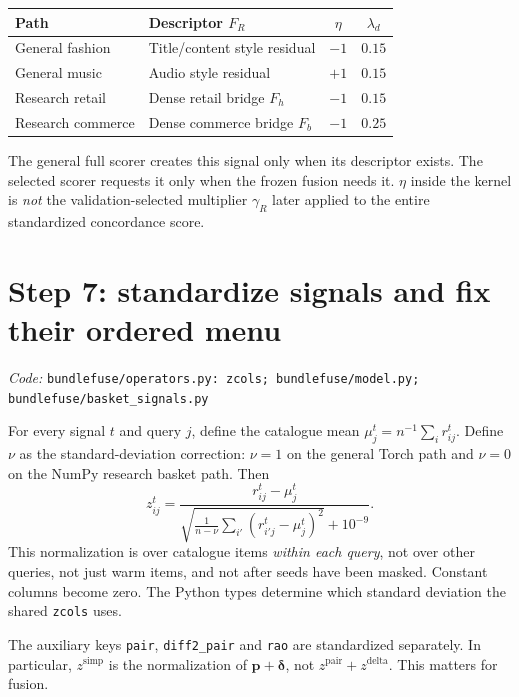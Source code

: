 \documentclass[11pt,a4paper]{article}
\newcommand{\code}[1]{\nolinkurl{#1}}
\newcommand{\src}[1]{\par\begingroup\raggedright\textit{Code: }\code{#1}\par\endgroup}
\newcommand{\sig}[1]{\mathrm{#1}}
\numberwithin{equation}{section}
\begin{document}
\begin{center}\small
\begin{tabularx}{\linewidth}{@{}p{.29\linewidth}Ycc@{}}
\toprule Path & Descriptor $F_R$ & $\eta$ & $\lambda_d$ \\\midrule
General fashion & Title/content style residual & $-1$ & $0.15$ \\
General music & Audio style residual & $+1$ & $0.15$ \\
Research retail & Dense retail bridge $F_h$ & $-1$ & $0.15$ \\
Research commerce & Dense commerce bridge $F_b$ & $-1$ & $0.25$ \\
\bottomrule
\end{tabularx}
\end{center}
The general full scorer creates this signal only when its descriptor exists. The selected
scorer requests it only when the frozen fusion needs it. $\eta$ inside the kernel is
\emph{not} the validation-selected multiplier $\gamma_R$ later applied to the entire
standardized concordance score.

\section{Step 7: standardize signals and fix their ordered menu}\label{sec:normalization}
\src{bundlefuse/operators.py: zcols; bundlefuse/model.py; bundlefuse/basket_signals.py}
For every signal $t$ and query $j$, define the catalogue mean
$\mu^t_j=n^{-1}\sum_i r^t_{ij}$. Define $\nu$ as the standard-deviation correction:
$\nu=1$ on the general Torch path and $\nu=0$ on the NumPy research basket path. Then
\begin{equation}\label{eq:z}
 z^t_{ij}=\frac{r^t_{ij}-\mu^t_j}
 {\sqrt{\frac{1}{n-\nu}\sum_{i'}(r^t_{i'j}-\mu^t_j)^2}+10^{-9}}.
\end{equation}
This normalization is over catalogue items \emph{within each query}, not over other queries,
not just warm items, and not after seeds have been masked. Constant columns become zero.
The Python types determine which standard deviation the shared \code{zcols} uses.

The auxiliary keys \code{pair}, \code{diff2_pair} and \code{rao} are standardized
separately. In particular, $z^{\sig{simp}}$ is the normalization of
$\bm p+\bm\delta$, not $z^{\sig{pair}}+z^{\sig{delta}}$. This matters for fusion.
\end{document}
